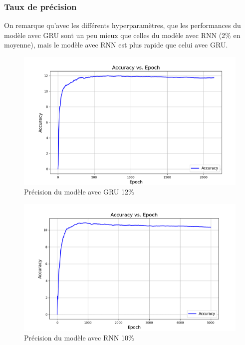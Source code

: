 \subsubsection{Taux de précision}
On remarque qu'avec les différents hyperparamètres, que les performances du modèle avec GRU sont un peu mieux que celles du modèle avec RNN (2\% en moyenne), mais le modèle avec RNN est plus rapide que celui avec GRU.
\begin{figure}[H]
    \centering
    \includegraphics[width=.8\textwidth]{figures/gru.png}
    \caption{Précision du modèle avec GRU 12\%}
    \label{fig:gru}
\end{figure}
\begin{figure}[H]
    \centering
    \includegraphics[width=.8\textwidth]{figures/rnn.png}
    \caption{Précision du modèle avec RNN 10\%}
    \label{fig:rnn}
\end{figure}

